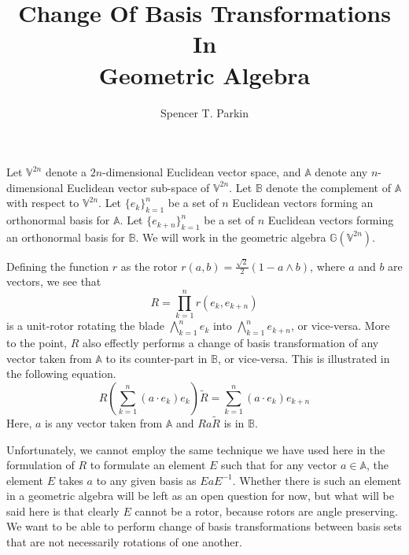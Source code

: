 \documentclass[12pt]{article}
\title{Change Of Basis Transformations\\In\\Geometric Algebra}
\author{Spencer T. Parkin}
\newcommand{\G}{\mathbb{G}}
\newcommand{\V}{\mathbb{V}}
\newcommand{\A}{\mathbb{A}}
\newcommand{\B}{\mathbb{B}}
\begin{document}
\maketitle

Let $\V^{2n}$ denote a $2n$-dimensional Euclidean vector space, and
$\A$ denote any $n$-dimensional Euclidean vector sub-space of $\V^{2n}$.
Let $\B$ denote the complement of $\A$ with respect to $\V^{2n}$.
Let $\{e_k\}_{k=1}^n$ be a set of $n$ Euclidean vectors
forming an orthonormal basis for $\A$.  Let $\{e_{k+n}\}_{k=1}^n$
be a set of $n$ Euclidean vectors forming an orthonormal basis for $\B$.
We will work in the geometric algebra $\G(\V^{2n})$.

Defining the function $r$ as the rotor $r(a,b)=\frac{\sqrt{2}}{2}(1-a\wedge b)$, where $a$ and
$b$ are vectors, we see that
\begin{equation*}
R = \prod_{k=1}^n r(e_k,e_{k+n})
\end{equation*}
is a unit-rotor rotating the blade $\bigwedge_{k=1}^n e_k$ into $\bigwedge_{k=1}^n e_{k+n}$, or vice-versa.
More to the point, $R$ also effectly performs a change of basis transformation of any
vector taken from $\A$ to its counter-part in $\B$, or vice-versa.  This is illustrated in the
following equation.
\begin{equation*}
R\left(\sum_{k=1}^n (a\cdot e_k)e_k\right)\tilde{R} = \sum_{k=1}^n (a\cdot e_k)e_{k+n}
\end{equation*}
Here, $a$ is any vector taken from $\A$ and $Ra\tilde{R}$ is in $\B$.

Unfortunately, we cannot employ the same technique we have used here in the
formulation of $R$ to formulate an element $E$ such that for any vector $a\in\A$,
the element $E$ takes $a$ to any given basis as $EaE^{-1}$.  Whether there
is such an element in a geometric algebra will be left as an open question for now,
but what will be said here is that clearly $E$ cannot be a rotor, because rotors
are angle preserving.  We want to be able to perform change of basis transformations
between basis sets that are not necessarily rotations of one another.
\end{document}

